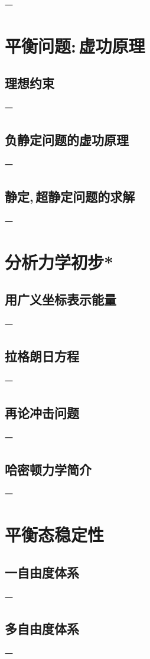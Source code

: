 一

\section{平衡问题:\,虚功原理}

\subsection{理想约束}

一

\subsection{负静定问题的虚功原理}

一

\subsection{静定,\,超静定问题的求解}

一

\section{分析力学初步*}

\subsection{用广义坐标表示能量}

一

\subsection{拉格朗日方程}

一

\subsection{再论冲击问题}

一

\subsection{哈密顿力学简介}

一

\section{平衡态稳定性}

\subsection{一自由度体系}

一

\subsection{多自由度体系}

一
